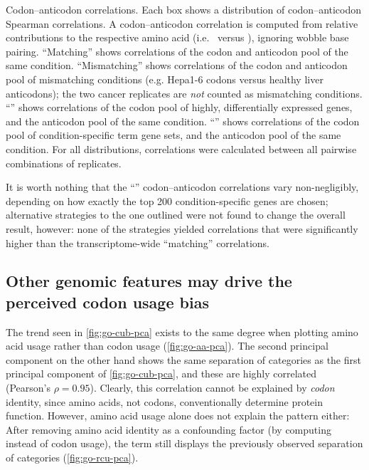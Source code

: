     {Codon--anticodon correlations.}
    {Each box shows a distribution of codon--anticodon Spearman correlations.
    A codon--anticodon correlation is computed from relative contributions to
    the respective amino acid (i.e.\  versus ), ignoring
    wobble base pairing. “Matching” shows correlations of the codon and
    anticodon pool of the same condition. “Mismatching” shows correlations of
    the codon and anticodon pool of mismatching conditions (e.g. Hepa1-6 codons
    versus healthy liver anticodons); the two cancer replicates are \emph{not}
    counted as mismatching conditions. “” shows correlations of the
    codon pool of highly, differentially expressed \mrna genes, and the
    anticodon pool of the same condition. “” shows correlations of the
    codon pool of condition-specific  term gene sets, and the anticodon
    pool of the same condition. For all distributions, correlations were
    calculated between all pairwise combinations of replicates.}

It is worth nothing that the “” codon--anticodon correlations vary
non-negligibly, depending on how exactly the top \num{200} condition-specific
genes are chosen; alternative strategies to the one outlined were not found to
change the overall result, however: none of the strategies yielded correlations
that were significantly higher than the transcriptome-wide “matching”
correlations.

\subsection{Other genomic features may drive the perceived codon usage bias}

The trend seen in \cref{fig:go-cub-pca} exists to the same degree when plotting
amino acid usage rather than codon usage (\cref{fig:go-aa-pca}).
The second principal component on the other hand shows the same separation of
\go categories as the first principal component of \cref{fig:go-cub-pca}, and
these are highly correlated (Pearson’s \(\rho = 0.95\)). Clearly, this
correlation cannot be explained by \emph{codon} identity, since amino acids, not
codons, conventionally determine protein function. However, amino acid usage
alone does not explain the pattern either: After removing amino acid identity as
a confounding factor (by computing \rcu instead of codon usage), the \go term
\pca still displays the previously observed separation of \go categories
(\cref{fig:go-rcu-pca}).

